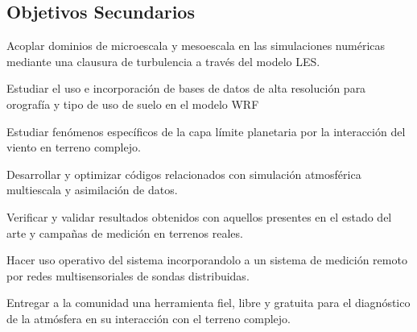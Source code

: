 \subsection{Objetivos Secundarios}
\begin{itemize*}
	\item Acoplar dominios de microescala y mesoescala en las simulaciones numéricas mediante una clausura de turbulencia a través del modelo LES.
	\item Estudiar el uso e incorporación de bases de datos de alta resolución para orografía y tipo de uso de suelo en el modelo WRF
	\item Estudiar fenómenos específicos de la capa límite planetaria por la interacción del viento en terreno complejo.
	\item Desarrollar y optimizar códigos relacionados con simulación atmosférica multiescala y asimilación de datos.
	\item Verificar y validar resultados obtenidos con aquellos presentes en el estado del arte y campañas de medición en terrenos reales.
	\item Hacer uso operativo del sistema incorporandolo a un sistema de medición remoto por redes multisensoriales de sondas distribuidas. 
	\item Entregar a la comunidad una herramienta fiel, libre y gratuita para el diagnóstico de la atmósfera en su interacción con el terreno complejo.
\end{itemize*}
